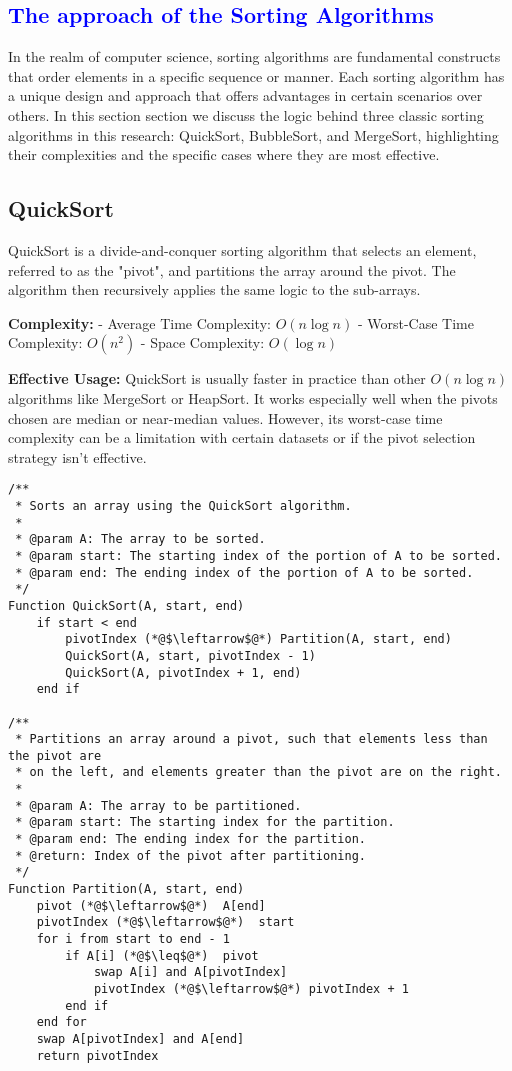 \textcolor{blue}{\section{The approach of the Sorting Algorithms}}

In the realm of computer science, sorting algorithms are fundamental constructs that order elements in a specific sequence or manner. Each sorting algorithm has a unique design and approach that offers advantages in certain scenarios over others. In this section section we discuss the logic behind three classic sorting algorithms in this research: QuickSort, BubbleSort, and MergeSort, highlighting their complexities and the specific cases where they are most effective.

\subsection{QuickSort}
QuickSort is a divide-and-conquer sorting algorithm that selects an element, referred to as the "pivot", and partitions the array around the pivot. The algorithm then recursively applies the same logic to the sub-arrays.

\textbf{Complexity:}
- Average Time Complexity: \(O(n \log n)\)
- Worst-Case Time Complexity: \(O(n^2)\)
- Space Complexity: \(O(\log n)\)

\textbf{Effective Usage:}
QuickSort is usually faster in practice than other \(O(n \log n)\) algorithms like MergeSort or HeapSort. It works especially well when the pivots chosen are median or near-median values. However, its worst-case time complexity can be a limitation with certain datasets or if the pivot selection strategy isn't effective.


\begin{lstlisting}[language=PseudoCode, caption=QuickSort and its Partition function]
/**
 * Sorts an array using the QuickSort algorithm.
 * 
 * @param A: The array to be sorted.
 * @param start: The starting index of the portion of A to be sorted.
 * @param end: The ending index of the portion of A to be sorted.
 */
Function QuickSort(A, start, end)
    if start < end
        pivotIndex (*@$\leftarrow$@*) Partition(A, start, end)
        QuickSort(A, start, pivotIndex - 1)
        QuickSort(A, pivotIndex + 1, end)
    end if

/**
 * Partitions an array around a pivot, such that elements less than the pivot are
 * on the left, and elements greater than the pivot are on the right.
 * 
 * @param A: The array to be partitioned.
 * @param start: The starting index for the partition.
 * @param end: The ending index for the partition.
 * @return: Index of the pivot after partitioning.
 */
Function Partition(A, start, end)
    pivot (*@$\leftarrow$@*)  A[end]
    pivotIndex (*@$\leftarrow$@*)  start
    for i from start to end - 1
        if A[i] (*@$\leq$@*)  pivot
            swap A[i] and A[pivotIndex]
            pivotIndex (*@$\leftarrow$@*) pivotIndex + 1
        end if
    end for
    swap A[pivotIndex] and A[end]
    return pivotIndex
\end{lstlisting}

